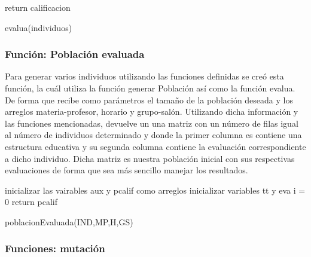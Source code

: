 \begin{algorithm}
	\setcounter{AlgoLine}{44}
	\SetAlgoVlined
	return calificacion\;	
	\caption{evalua(individuos)}
\end{algorithm}

\subsubsection{Función: Población evaluada}

Para generar varios individuos utilizando las funciones definidas se creó esta función, la cuál utiliza la función generar Población así como la función evalua. De forma que recibe como parámetros el tamaño de la población deseada y los arreglos materia-profesor, horario y grupo-salón. Utilizando dicha información y las funciones mencionadas, devuelve un una matriz con un número de filas igual al número de individuos determinado y donde la primer columna es contiene una estructura educativa y su segunda columna contiene la evaluación correspondiente a dicho individuo. Dicha matriz es nuestra población inicial con sus respectivas evaluaciones de forma que sea más sencillo manejar los resultados.\\

\begin{algorithm}[H]
	\DontPrintSemicolon
	\SetAlgoLined
	inicializar las vairables aux y pcalif como arreglos\;
	inicializar variables tt y eva
	i = 0\;
	return pcalif\;
	\caption{poblacionEvaluada(IND,MP,H,GS)}
\end{algorithm}


\subsubsection{Funciones: mutación}


